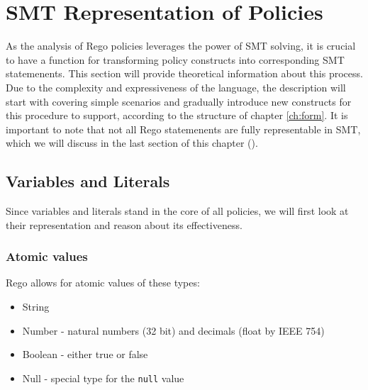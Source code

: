 %
%


\chapter{SMT Representation of Policies}
\label{ch:04}

As the analysis of Rego policies leverages the power of SMT solving, it is crucial to have a function for transforming policy constructs into corresponding SMT statemenents.
This section will provide theoretical information about this process.
Due to the complexity and expressiveness of the language, the description will start with covering simple scenarios and gradually introduce new constructs for this procedure to support, according to the structure of chapter \ref{ch:form}.
It is important to note that not all Rego statemenents are fully representable in SMT, which we will discuss in the last section of this chapter ().

\section{Variables and Literals}

Since variables and literals stand in the core of all policies, we will first look at their representation and reason about its effectiveness.

\subsection{Atomic values}

Rego allows for atomic values of these types:
\begin{itemize}
  \item String
  \item Number - natural numbers (32 bit) and decimals (float by IEEE 754)
  \item Boolean - either true or false
  \item Null - special type for the \texttt{null} value
\end{itemize}

